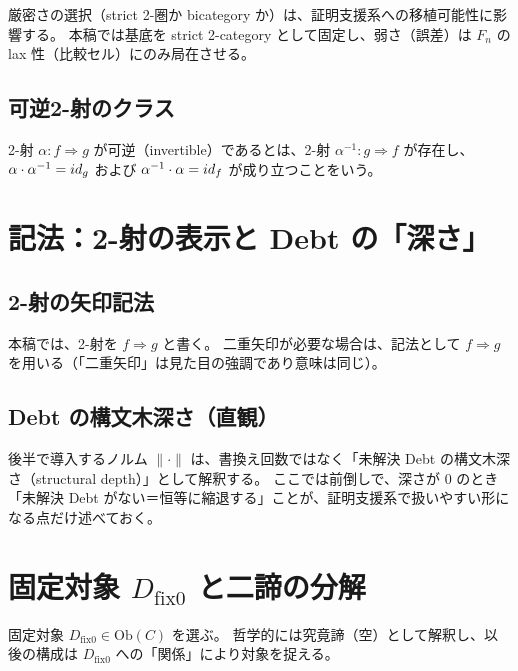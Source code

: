 \documentclass[a4paper,11pt]{article}
\begin{document}
\begin{remark}
厳密さの選択（strict 2-圏か bicategory か）は、証明支援系への移植可能性に影響する。
本稿では基底を strict 2-category として固定し、弱さ（誤差）は $F_n$ の lax 性（比較セル）にのみ局在させる。
\end{remark}

\subsection{可逆2-射のクラス}
\begin{definition}[可逆2-射]
2-射 $\alpha:f\Rightarrow g$ が可逆（invertible）であるとは、2-射 $\alpha^{-1}:g\Rightarrow f$ が存在し、
$\alpha\cdot\alpha^{-1}=id_g$ および $\alpha^{-1}\cdot\alpha=id_f$ が成り立つことをいう。
\end{definition}

\section{記法：2-射の表示と Debt の「深さ」}
\subsection{2-射の矢印記法}
\begin{remark}
本稿では、2-射を $f\Rightarrow g$ と書く。
二重矢印が必要な場合は、記法として $f \Rightarrow g$ を用いる（「二重矢印」は見た目の強調であり意味は同じ）。
\end{remark}

\subsection{Debt の構文木深さ（直観）}
\begin{remark}
後半で導入するノルム $\|\cdot\|$ は、書換え回数ではなく「未解決 Debt の構文木深さ（structural depth）」として解釈する。
ここでは前倒しで、深さが 0 のとき「未解決 Debt がない＝恒等に縮退する」ことが、証明支援系で扱いやすい形になる点だけ述べておく。
\end{remark}

\section{固定対象 \texorpdfstring{$D_{\mathrm{fix}0}$}{Dfix0} と二諦の分解}
\begin{definition}[固定対象]
固定対象 $D_{\mathrm{fix}0}\in\mathrm{Ob}(C)$ を選ぶ。
哲学的には究竟諦（空）として解釈し、以後の構成は $D_{\mathrm{fix}0}$ への「関係」により対象を捉える。
\end{definition}
\end{document}
